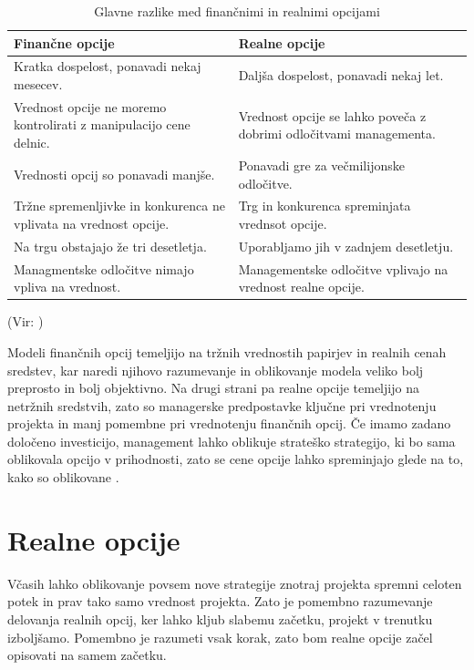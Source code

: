 \documentclass[12pt, a4paper]{amsart}
\theoremstyle{definition} %
\theoremstyle{plain} %
\begin{document}
\begin{table}[ht]
	\caption{Glavne razlike med finančnimi in realnimi opcijami}
	\centering
	\begin{tabular}{|L|L|}
	\hline
	\textbf{Finančne opcije}&\textbf{Realne opcije}\\
	\hline
	\hline
	Kratka dospelost, ponavadi nekaj mesecev. & Daljša dospelost, ponavadi nekaj let. \\
	\hline
	Vrednost opcije ne moremo kontrolirati z manipulacijo cene delnic. & Vrednost opcije se lahko poveča z dobrimi odločitvami managementa. \\
	\hline
	 Vrednosti opcij so ponavadi manjše. & Ponavadi gre za večmilijonske odločitve. \\
	\hline
	Tržne spremenljivke in konkurenca ne vplivata na vrednost opcije. & Trg in konkurenca spreminjata vrednsot opcije. \\
	\hline
	Na trgu obstajajo že tri desetletja. & Uporabljamo jih v zadnjem desetletju. \\
	\hline
	Managmentske odločitve nimajo vpliva na vrednost. & Managementske odločitve vplivajo na vrednost realne opcije. \\
	\hline
\end{tabular}
	\label{table: tabela4}
\end{table}  
(Vir: \cite[str. 110]{Mun})

Modeli finančnih opcij temeljijo na tržnih vrednostih papirjev in realnih cenah sredstev, kar naredi njihovo razumevanje in oblikovanje modela veliko bolj preprosto in bolj objektivno. Na drugi strani pa realne opcije temeljijo na netržnih sredstvih, zato so managerske predpostavke ključne pri vrednotenju projekta in manj pomembne pri vrednotenju finančnih opcij. Če imamo zadano določeno investicijo, management lahko oblikuje strateško strategijo, ki bo sama oblikovala opcijo v prihodnosti, zato se cene opcije lahko spreminjajo glede na to, kako so oblikovane \cite[str. 110, 111]{Mun}. \\

\section{Realne opcije}
Včasih lahko oblikovanje povsem nove strategije znotraj projekta spremni celoten potek in prav tako samo vrednost projekta. Zato je pomembno razumevanje delovanja realnih opcij, ker lahko kljub slabemu začetku, projekt v trenutku izboljšamo. Pomembno je razumeti vsak korak, zato bom realne opcije začel opisovati na samem začetku.
\end{document}
